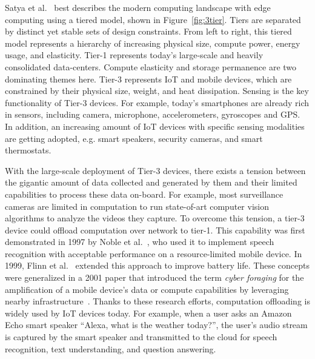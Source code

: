 Satya et al.~\cite{satya2019computing} best describes the modern computing
landscape with edge computing using a tiered model, shown in
Figure~\ref{fig:3tier}. Tiers are separated by distinct yet stable sets of
design constraints. From left to right, this tiered model represents a hierarchy
of increasing physical size, compute power, energy usage, and elasticity. Tier-1
represents today's large-scale and heavily consolidated data-centers. Compute
elasticity and storage permanence are two dominating themes here. Tier-3
represents IoT and mobile devices, which are constrained by their physical size,
weight, and heat dissipation. Sensing is the key functionality of Tier-3
devices. For example, today's smartphones are already rich in sensors, including
camera, microphone, accelerometers, gyroscopes and GPS. In addition, an
increasing amount of IoT devices with specific sensing modalities are getting
adopted, e.g. smart speakers, security cameras, and smart thermostats. 

With the large-scale deployment of Tier-3 devices, there exists a tension
between the gigantic amount of data collected and generated by them and their
limited capabilities to process these data on-board. For example, most
surveillance cameras are limited in computation to run state-of-art computer
vision algorithms to analyze the videos they capture. To overcome this tension,
a tier-3 device could offload computation over network to tier-1. This
capability was first demonstrated in 1997 by Noble et al.~\cite{Noble1997}, who
used it to implement speech recognition with acceptable performance on a
resource-limited mobile device. In 1999, Flinn et al.~\cite{Flinn1999} extended
this approach to improve battery life.  These concepts were generalized in a
2001 paper that introduced the term {\em cyber foraging} for the amplification
of a mobile device's data or compute capabilities by leveraging nearby
infrastructure~\cite{Satya2001}.  Thanks to these research efforts, computation
offloading is widely used by IoT devices today. For example, when a user asks an
Amazon Echo smart speaker ``Alexa, what is the weather today?'', the user's
audio stream is captured by the smart speaker and transmitted to the cloud for
speech recognition, text understanding, and question answering.

